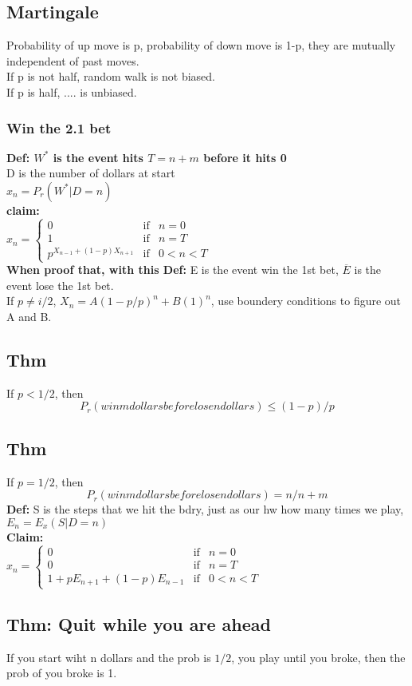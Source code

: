 \documentclass{article}
\begin{document}
\subsection{Martingale}
Probability of up move is p, probability of down move is 1-p, they are mutually independent of past moves. \\
If p is not half, random walk is not biased.  \\
If p is half, .... is unbiased.  \\
\subsubsection{Win the 2.1 bet}
\textbf{Def: $W^*$ is the event hits $T=n+m$ before it hits 0} \\
D is the number of dollars at start  \\
$x_n = P_r(W^*|D=n)$ \\
\textbf{claim:}  \\
$x_n = \left\{ \begin{array}{rcl}
	0 & \mbox{if} & n=0 \\ 1 & \mbox{if} & n=T \\
	p^{X_{n-1}+(1-p)X_{n+1}} & \mbox{if} & 0<n<T
\end{array}\right.$ \\
\textbf{When proof that, with this Def: }E is the event win the 1st bet, $\overline{E}$ is the event lose the 1st bet. \\
If $p\neq i/2$, $X_n=A(1-p/p)^n+B(1)^n$, use boundery conditions to figure out A and B. \\
\subsection{Thm}
If $p<1/2$, then
$$ P_r(win m dollars before lose n dollars)\leq (1-p)/p $$
\subsection{Thm}
If $p=1/2$, then
$$ P_r(win m dollars before lose n dollars)=n/n+m $$
\textbf{Def:} S is the steps that we hit the bdry, just as our hw how many times we play, $E_n=E_x(S|D=n)$ \\
\textbf{Claim:} \\
$x_n = \left\{ \begin{array}{rcl}
0 & \mbox{if} & n=0 \\ 0 & \mbox{if} & n=T \\
1+pE_{n+1}+(1-p)E_{n-1} & \mbox{if} & 0<n<T
\end{array}\right.$ \\
\subsection{Thm: Quit while you are ahead}
If you start wiht n dollars and the prob is $1/2$, you play until you broke, then the prob of you broke is 1. \\
\end{document}
